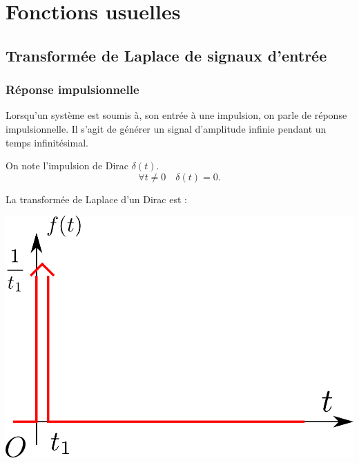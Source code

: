 \documentclass[11pt,oneside]{article}
\begin{document}
\section{Fonctions usuelles}
\subsection{Transformée de Laplace de signaux d'entrée}
\subsubsection*{Réponse impulsionnelle}
Lorsqu'un système est soumis à, son entrée à une impulsion, on parle de réponse impulsionnelle. Il s'agit de générer un signal d'amplitude infinie pendant un temps infinitésimal. 

\begin{minipage}[c]{.6\linewidth}
\begin{defi}
On note l'impulsion de Dirac $\delta(t)$.
$$
\forall t \neq 0 \quad \delta(t)=0.
$$

La transformée de Laplace d'un Dirac est :

\end{defi}
\end{minipage} \hfill
\begin{minipage}[c]{.35\linewidth}
\begin{center}
\includegraphics[width=.9\textwidth]{png/dirac}
\end{center}
\end{minipage}
\end{document}
